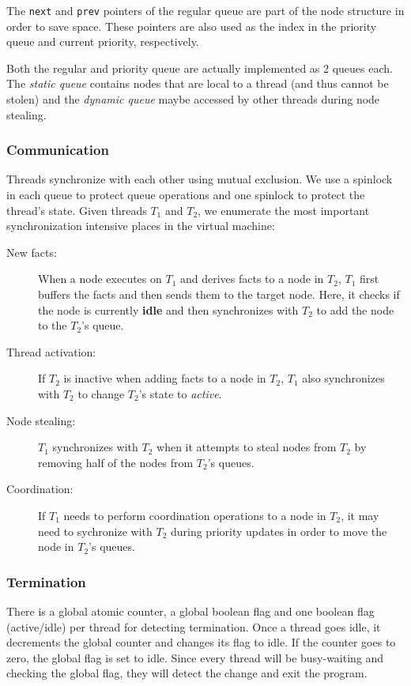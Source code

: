 The \texttt{next} and \texttt{prev} pointers of the regular queue are part of
the node structure in order to save space. These pointers are also used as the
index in the priority queue and current priority, respectively.

Both the regular and priority queue are actually implemented as 2 queues each.
The \emph{static queue} contains nodes that are local to a thread (and thus cannot be stolen) and
the \emph{dynamic queue} maybe accessed by other threads during node stealing.

\subsubsection{Communication}

Threads synchronize with each other using mutual exclusion. We use a spinlock in
each queue to protect queue operations and one spinlock to protect the thread's
state. Given threads $T_1$ and $T_2$, we enumerate the most important
synchronization intensive places in the virtual machine:

\begin{description}
   \item[New facts:] When a node executes on $T_1$ and derives facts
   to a node in $T_2$, $T_1$ first buffers the facts 
   and then sends them to the target node. Here, it checks if the
   node is currently \textbf{idle} and then synchronizes with $T_2$ to add the
   node to the $T_2$'s queue.
   \item[Thread activation:] If $T_2$ is inactive when adding facts to a node in
   $T_2$, $T_1$ also synchronizes with $T_2$ to change $T_2$'s state to \emph{active}.
   \item[Node stealing:] $T_1$ synchronizes with $T_2$ when it attempts to steal
   nodes from $T_2$ by removing half of the nodes from $T_2$'s queues.
   \item[Coordination:] If $T_1$ needs to perform coordination operations
   to a node in $T_2$, it may need to sychronize with $T_2$ during priority
   updates in order to move the node in $T_2$'s queues.
\end{description}

\subsubsection{Termination}

There is a global atomic counter, a global boolean flag and one boolean flag
(active/idle) per thread for detecting termination. Once a thread goes idle,
it decrements the global counter and changes its flag to idle. If the counter
goes to zero, the global flag is set to idle. Since every thread will be
busy-waiting and checking the global flag, they will detect the change and exit
the program.

